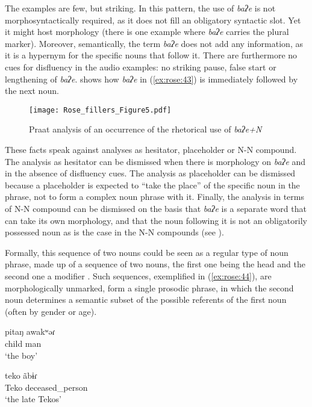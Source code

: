 \documentclass[output=paper]{langscibook}
\begin{document}
The examples are few, but striking. In this pattern, the use of \textit{baʔe} is not morphosyntactically required, as it does not fill an obligatory syntactic slot. Yet it might host morphology (there is one example where \textit{baʔe} carries the plural marker). Moreover, semantically, the term \textit{baʔe} does not add any information, as it is a hypernym for the specific nouns that follow it. There are furthermore no cues for disfluency in the audio examples: no striking pause, false start or lengthening of \textit{baʔe}.  shows how \textit{baʔe} in (\ref{ex:rose:43}) is immediately followed by the next noun.

\begin{figure}
\texttt{[image: Rose\_fillers\_Figure5.pdf]}
\caption{\label{fig:rose:5}Praat analysis of an occurrence of the rhetorical use of \textit{baʔe+N}}
\end{figure}

These facts speak against analyses as hesitator, placeholder or N-N compound. The analysis as hesitator can be dismissed when there is morphology on \textit{baʔe} and in the absence of disfluency cues. The analysis as placeholder can be dismissed because a placeholder is expected to “take the place” of the specific noun in the phrase, not to form a complex noun phrase with it. Finally, the analysis in terms of N-N compound can be dismissed on the basis that \textit{baʔe} is a separate word that can take its own morphology, and that the noun following it is not an obligatorily possessed noun as is the case in the N-N compounds (see ).

Formally, this sequence of two nouns could be seen as a regular type of noun phrase, made up of a sequence of two nouns, the first one being the head and the second one a modifier \citep[156--158]{Rose2011}. Such sequences, exemplified in (\ref{ex:rose:44}), are morphologically unmarked, form a single prosodic phrase, in which the second noun determines a semantic subset of the possible referents of the first noun (often by gender or age).


\ea \label{ex:rose:44}
\ea \gll pitaŋ   awakʷəɾ\\
       child  man\\
\glt   ‘the boy’

\ex \gll teko   ãbɨɾ\\
     Teko  deceased\_person\\
\glt   ‘the late Tekos’
\z 
\z
\end{document}
